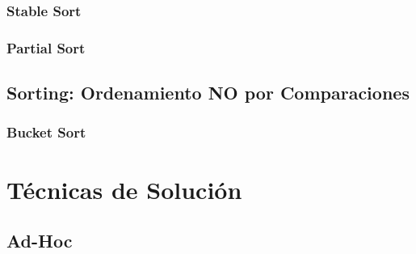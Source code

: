 \documentclass[12pt, fleqn]{report}                             %
\theoremstyle{break}                                            %
\begin{document}
        \section{Stable Sort}

        \section{Partial Sort}


    \clearpage
    \chapter{Sorting: Ordenamiento NO por Comparaciones}
        
        \section{Bucket Sort}


\part{Técnicas de Solución}

\clearpage
\chapter{Ad-Hoc}
\end{document}
